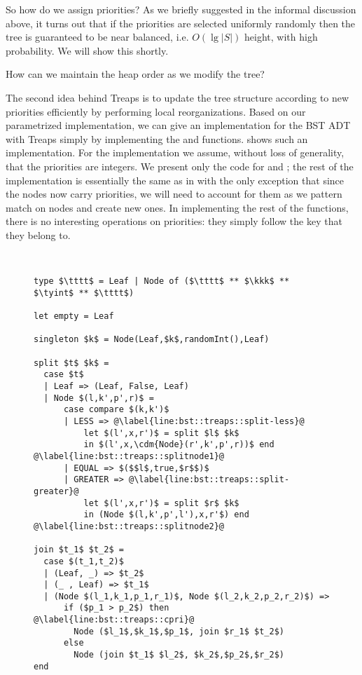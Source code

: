 So how do we assign priorities?  As we briefly suggested in the
informal discussion above, it turns out that if the priorities are
selected uniformly randomly then the tree is guaranteed to be near
balanced, i.e. $O(\lg |S|)$ height, with high probability.  We will
show this shortly.

\begin{question}
How can we maintain the heap order as we modify the tree?
\end{question}

The second idea behind Treaps is to update the tree structure
according to new priorities efficiently by performing local
reorganizations.
%
Based on our parametrized implementation, we can give an
implementation for the BST ADT with Treaps simply by implementing the
 and  functions.   shows
such an implementation.  For the implementation we assume, without
loss of generality, that the priorities are integers.  We present only
the code for  and ; the rest of the
implementation is essentially the same as in 
with the only exception that since the nodes now carry priorities, we
will need to account for them as we pattern match on nodes and create
new ones.  In implementing the rest of the functions, there is no
interesting operations on priorities: they simply follow the key that
they belong to.



\begin{figure}
\begin{datastructure}~
\label{ds:bst::treaps}
\begin{lstlisting}
type $\tttt$ = Leaf | Node of ($\tttt$ ** $\kkk$ ** $\tyint$ ** $\tttt$)

let empty = Leaf

singleton $k$ = Node(Leaf,$k$,randomInt(),Leaf)

split $t$ $k$ = 
  case $t$ 
  | Leaf => (Leaf, False, Leaf)
  | Node $(l,k',p',r)$ =
      case compare $(k,k')$
      | LESS => @\label{line:bst::treaps::split-less}@
          let $(l',x,r')$ = split $l$ $k$
          in $(l',x,\cdm{Node}(r',k',p',r))$ end @\label{line:bst::treaps::splitnode1}@
      | EQUAL => $($$l$,true,$r$$)$
      | GREATER => @\label{line:bst::treaps::split-greater}@
          let $(l',x,r')$ = split $r$ $k$
          in (Node $(l,k',p',l'),x,r'$) end @\label{line:bst::treaps::splitnode2}@

join $t_1$ $t_2$ =
  case $(t_1,t_2)$
  | (Leaf, _) => $t_2$
  | (_ , Leaf) => $t_1$
  | (Node $(l_1,k_1,p_1,r_1)$, Node $(l_2,k_2,p_2,r_2)$) =>
      if ($p_1 > p_2$) then  @\label{line:bst::treaps::cpri}@
        Node ($l_1$,$k_1$,$p_1$, join $r_1$ $t_2$)
      else
        Node (join $t_1$ $l_2$, $k_2$,$p_2$,$r_2$)
end
\end{lstlisting}
\end{datastructure}
\end{figure}

